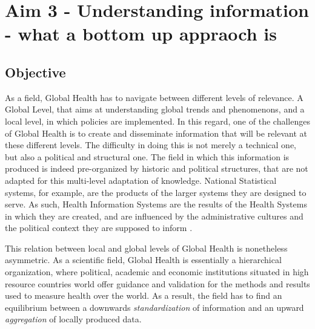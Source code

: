\section[Understanding Information]{Aim 3 - Understanding information - what a bottom up appraoch is}

\subsection{Objective}

As a field, Global Health has to navigate between different levels of relevance. A Global Level, that aims at understanding global trends and phenomenons, and a local level, in which policies are implemented. In this regard, one of the challenges of Global Health is to create and disseminate information that will be relevant at these different levels. The difficulty in doing this is not merely a technical one, but also a political and structural one. The field in which this information is produced is indeed pre-organized by historic and political structures, that are not adapted for this multi-level adaptation of knowledge. National Statistical systems, for example, are the products of the larger systems they are designed to serve. As such, Health Information Systems are the results of the Health Systems in which they are created, and are influenced by the administrative cultures and the political context they are supposed to inform \citep{bergeron_savoirs_2014}.

This relation between local and global levels of Global Health is nonetheless asymmetric. As a scientific field, Global Health is essentially a hierarchical organization, where political, academic and economic institutions situated in high resource countries world offer guidance and validation for the methods and results used to measure health over the world. As a result, the field has to find an equilibrium between a downwards  \textit{standardization} of information and an upward \textit{aggregation} of locally produced data.

